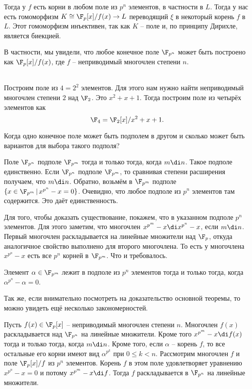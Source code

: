 Тогда у $f$ есть корни в любом поле из $p^n$ элементов, в частности в $L$. Тогда у нас есть гомоморфизм  $K\cong\F_p[x]/f(x)\to L$ переводящий $\xi$ в некоторый корень $f$ в $L$. Этот гомоморфизм инъективен, так как $K$ -- поле и, по принципу Дирихле, является биекцией. 
\endproof
 
\rm В частности, мы увидели, что любое конечное поле $\F_{p^n}$ может быть построено как $\F_p[x]/f(x)$, где $f$ -- неприводимый многочлен степени $n$.
\erm

\\
Построим поле из $4=2^2$ элементов. Для этого нам нужно найти неприводимый многочлен степени $2$ над $\F_2$. Это $x^2+x+1$. Тогда построим поле из четырёх элементов как
$$\F_4= \F_2[x]/x^2+x+1.$$

Когда одно конечное поле может быть подполем в другом и сколько может быть вариантов для выбора такого подполя?

\thrm Поле $\F_{p^n}$ подполе $\F_{p^m}$ тогда и только тогда, когда $m\di n$. Такое подполе единственно.
\ethrm 
\proof
Если $\F_{p^n}$ подполе $\F_{p^m}$, то сравнивая степени расширения получаем, что $m \di n$. Обратно, возьмём в $\F_{p^m}$ подполе $\{x \in \F_{p^m} \,|\, x^{p^n}-x=0\}$. Очевидно, что любое подполе из $p^n$ элементов там содержится. Это даёт единственность. 


Для того, чтобы доказать существование, покажем, что в указанном подполе $p^n$ элементов. Для этого заметим, что многочлен $x^{p^m}-x \di x^{p^n}-x$, если $m \di n$. Первый многочлен раскладывается на линейные множители над $\F_p$, откуда аналогичное свойство выполнено для второго многочлена. То есть у многочлена $x^{p^n}-x$ есть все $p^n$ корней в $\F_{p^m}$. Что и требовалось. 
\endproof
 



\crl Элемент $\alpha\in \F_{p^m}$ лежит в подполе из $p^n$ элементов тогда и только тогда, когда $\alpha^{p^n}-\alpha=0$.
\ecrl

Так же, если внимательно посмотреть на доказательство основной теоремы, то можно увидеть ещё несколько закономерностей.

\utv Пусть $f(x) \in \F_p[x]$ -- неприводимый многочлен степени $n$. Многочлен $f(x)$ раскладывается над $\F_{p^n}$ на линейные множители. Кроме того $x^{p^m}-x \di f(x)$ тогда и только тогда, когда $m\di n$. Кроме того, если $\alpha$ --  корень $f$, то все остальные его корни имеют вид $\alpha^{p^k}$ при $0\leq k<n$. 
\eutv
\proof Рассмотрим многочлен $f$ и поле $\F_p[x]/f$ из $p^n$ элементов. Корень $f$ в этом поле удовлетворяет уравнению $x^{p^n}-x=0$ и потому  $x^{p^m}-x \di f$. Тогда $f$ раскладывается в $\F_{p^n}$ на линейные множители. 

